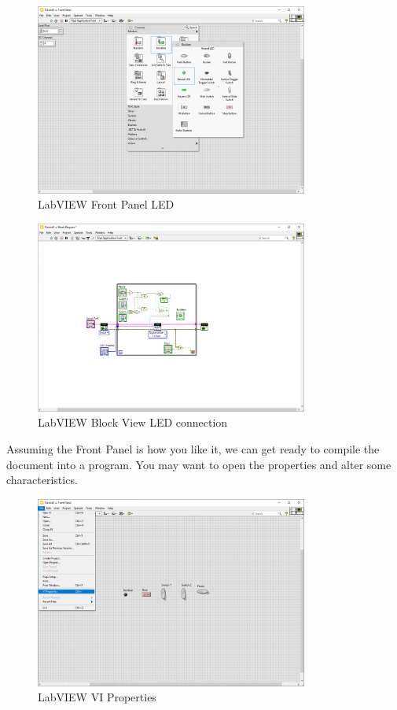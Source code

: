 \documentclass[a4paper,11pt]{report}
\begin{document}
\begin{figure}[H]
\centering
\includegraphics[width=0.8\textwidth]{screenshots/labview34}
\caption{LabVIEW Front Panel LED}
\end{figure}

\begin{figure}[H]
\centering
\includegraphics[width=0.8\textwidth]{screenshots/labview35}
\caption{LabVIEW Block View LED connection}
\end{figure}

Assuming the Front Panel is how you like it, we can get ready to compile the document into a program. You may want to open the properties and alter some characteristics.

\begin{figure}[H]
\centering
\includegraphics[width=0.8\textwidth]{screenshots/labview36}
\caption{LabVIEW VI Properties}
\end{figure}
\end{document}
